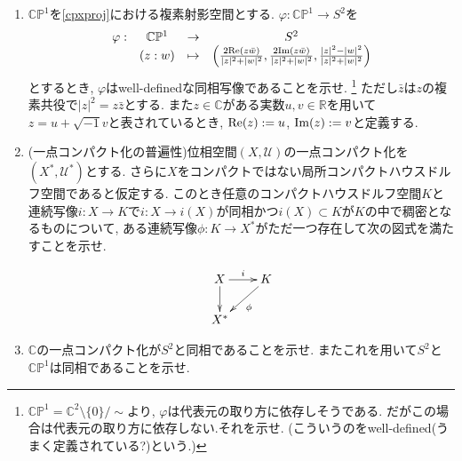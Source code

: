 \documentclass[dvipdfmx,a4paper,11pt]{article}
\newcommand{\R}{\mathbb{R}}
\newcommand{\C}{\mathbb{C}}
\theoremstyle{definition}
\begin{document}
\begin{enumerate}[label=\textbf{問}\ref*{sec-compact}.\arabic*]
\item $\C\mathbb{P}^1$を\ref{cpxproj}における複素射影空間とする. $\varphi: \C\mathbb{P}^1  \rightarrow S^2$を
$$
      \begin{matrix}
     \varphi: &\C\mathbb{P}^1 & \rightarrow &S^2\\
      &(z: w)& \mapsto& \left(\frac{2{\rm Re}(z\bar{w})}{|z|^2 + |w|^2}, \frac{2{\rm Im}(z\bar{w})}{|z|^2 + |w|^2}, \frac{|z|^2 - |w|^2}{|z|^2 + |w|^2}\right)
       \end{matrix}
      $$
とするとき, $\varphi$はwell-definedな同相写像であることを示せ. \footnote{$\C\mathbb{P}^1 = \C^2 \setminus \{0\} /\sim $より, $\varphi$は代表元の取り方に依存しそうである. だがこの場合は代表元の取り方に依存しない.それを示せ. (こういうのをwell-defined(うまく定義されている?)という.)}
ただし$\bar{z}$は$z$の複素共役で$|z|^2 = z \bar{z}$とする. また$z \in \C$がある実数$u,v \in \R$を用いて$z = u + \sqrt{-1}v$と表されているとき, ${\rm Re}(z) := u$, ${\rm Im}(z) := v$と定義する. 

\item (一点コンパクト化の普遍性)位相空間$(X, \mathscr{U})$の一点コンパクト化を$(X^{*}, \mathscr{U}^{*})$とする. 
さらに$X$をコンパクトではない局所コンパクトハウスドルフ空間であると仮定する.
このとき任意のコンパクトハウスドルフ空間$K$と連続写像$i : X \rightarrow K$で$i : X \rightarrow i(X)$が同相かつ$i(X) \subset K$が$K$の中で稠密となるものについて, ある連続写像$\phi : K \rightarrow X^{*}$がただ一つ存在して次の図式を満たすことを示せ.

\vspace{-22pt}
  \begin{equation*}
\xymatrix@C=20pt@R=20pt{
X\ar@{->}[d]  \ar@{->}[r]^{i} & K\ar@{->}[ld]^{\phi}  \\
X^{*} & 
 }
\end{equation*}
\item $\C$の一点コンパクト化が$S^2$と同相であることを示せ. またこれを用いて$S^2$と$\C\mathbb{P}^1$は同相であることを示せ.




\end{enumerate}
\end{document}
